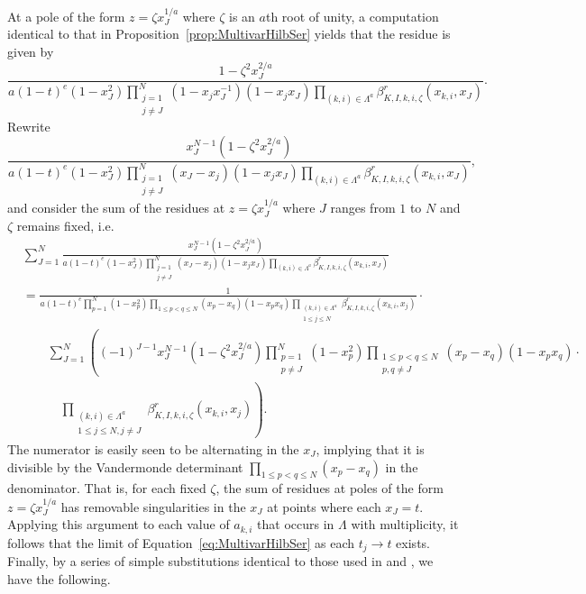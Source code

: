 \documentclass{amsart}
\theoremstyle{definition}
\theoremstyle{remark}
\begin{document}
At a pole of the form $z = \zeta x_J^{1/a}$ where $\zeta$ is an $a$th root of unity, a computation identical to
that in Proposition~\ref{prop:MultivarHilbSer} yields that the residue is given by
\[
    \frac{ 1 - \zeta^2 x_J^{2/a}}
    {a (1 - t)^e (1 - x_J^2)
    \prod\limits_{\substack{j=1\\ j\neq J}}^N
    (1 - x_j x_J^{-1}) (1 - x_j x_J)
        \prod\limits_{(k,i)\in\Lambda^a}
            \beta_{K,I,k,i,\zeta}^r(x_{k,i}, x_J)}.
\]
Rewrite
\[
    \frac{ x_J^{N-1} (1 - \zeta^2 x_J^{2/a})}
    {a(1 - t)^e (1 - x_J^2)
    \prod\limits_{\substack{j=1\\ j\neq J}}^N
    (x_J - x_j) (1 - x_j x_J)
        \prod\limits_{(k,i)\in\Lambda^a}
            \beta_{K,I,k,i,\zeta}^r(x_{k,i}, x_J)},
\]
and consider the sum of the residues at $z = \zeta x_J^{1/a}$ where $J$ ranges from $1$ to $N$ and
$\zeta$ remains fixed, i.e.
\begin{align*}
    &\sum\limits_{J=1}^N \frac{ x_J^{N-1} (1 - \zeta^2 x_J^{2/a})}
    {a(1 - t)^e (1 - x_J^2)
    \prod\limits_{\substack{j=1\\ j\neq J}}^N
    (x_J - x_j) (1 - x_j x_J)
        \prod\limits_{(k,i)\in\Lambda^a}
            \beta_{K,I,k,i,\zeta}^r(x_{k,i}, x_J)}
    \\ &=
    \frac{1}
    {a(1 - t)^e\prod\limits_{p=1}^N(1 - x_p^2)
    \prod\limits_{1\leq p < q \leq N}
    (x_p - x_q) (1 - x_p x_q)
        \prod\limits_{\substack{(k,i)\in\Lambda^a\\ 1\le j \le N}}
            \beta_{K,I,k,i,\zeta}^r(x_{k,i}, x_j)}\cdot\\
    & \quad\quad \sum\limits_{J=1}^N  \left((-1)^{J-1} x_J^{N-1} (1 - \zeta^2 x_J^{2/a})
     \prod\limits_{\substack{p=1\\ p\neq J}}^N(1 - x_p^2)
        \prod\limits_{\substack{{1\leq p < q \leq N} \\ p,q\neq J}}
            (x_p - x_q) (1 - x_p x_q)\cdot \right. \\ & \quad\quad\quad
        \left.
        \prod\limits_{\substack{(k,i)\in\Lambda^a\\ 1\le j \le N, j\ne J}}
            \beta_{K,I,k,i,\zeta}^r(x_{k,i}, x_j)\right).
\end{align*}
The numerator is easily seen to be alternating in the $x_J$, implying that it is divisible
by the Vandermonde determinant $\prod_{1\leq p < q \leq N}(x_p - x_q)$ in the denominator.
That is, for each fixed $\zeta$, the sum of residues at poles of the form $z = \zeta x_J^{1/a}$
has removable singularities in the $x_J$ at points where each $x_J = t$. Applying this argument
to each value of $a_{k,i}$ that occurs in $\Lambda$ with multiplicity, it follows that the
limit of Equation~\eqref{eq:MultivarHilbSer} as each $t_j\to t$ exists. Finally, by a series of
simple substitutions identical to those used in \cite[pages 52--53]{HerbigSeaton} and
\cite[proof of Theorem 3.3]{CowieHerbigSeatonHerden}, we have the following.
\end{document}
